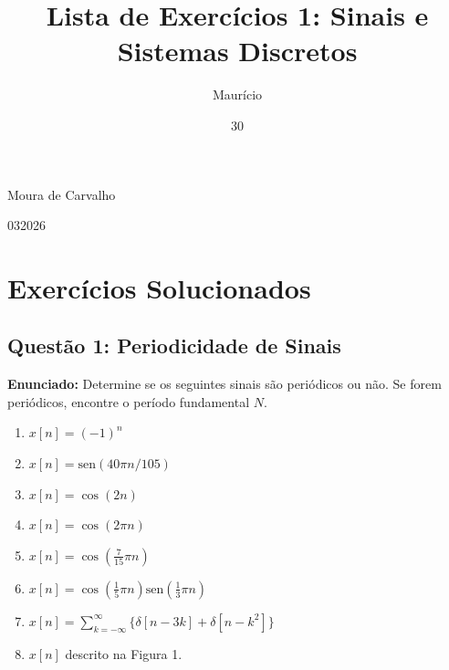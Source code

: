 \documentclass[tcc]{classe_uftex/uftex}
\begin{document}
  \title{Lista de Exercícios 1: Sinais e Sistemas Discretos}
  \author{Maurício}{Moura de Carvalho}

  
  \date{30}{03}{2026}
  

  
  \maketitle
  \frontmatter

  \tableofcontents 
  
  \mainmatter
  \setcounter{page}{1} 
  \onehalfspacing


\chapter{Exercícios Solucionados}

\section{Questão 1: Periodicidade de Sinais}

\textbf{Enunciado:} Determine se os seguintes sinais são periódicos ou não. Se forem periódicos, encontre o período fundamental $N$.

\begin{enumerate}
    \item[\textbf{a)}] $x[n] = (-1)^n$
    \item[\textbf{b)}] $x[n] = \text{sen}(40\pi n/105)$
    \item[\textbf{c)}] $x[n] = \cos(2n)$
    \item[\textbf{d)}] $x[n] = \cos(2\pi n)$
    \item[\textbf{e)}] $x[n] = \cos(\frac{7}{15}\pi n)$
    \item[\textbf{f)}] $x[n] = \cos(\frac{1}{5}\pi n)\text{sen}(\frac{1}{3}\pi n)$
    \item[\textbf{g)}] $x[n] = \sum_{k=-\infty}^{\infty} \{\delta[n-3k] + \delta[n-k^2]\}$
    \item[\textbf{h)}] $x[n]$ descrito na Figura 1.
\end{enumerate}
\end{document}

